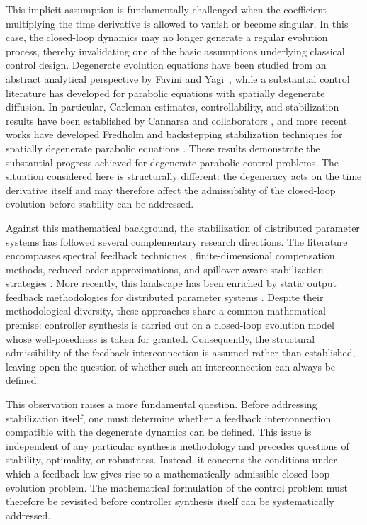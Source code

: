 \documentclass[pdflatex,sn-mathphys-num]{sn-jnl}
\theoremstyle{thmstyleone}%
\theoremstyle{thmstyletwo}%
\theoremstyle{thmstylethree}%
\begin{document}
This implicit assumption is fundamentally challenged when the coefficient multiplying the time derivative is allowed to vanish or become singular. In this case, the closed-loop dynamics may no longer generate a regular evolution process, thereby invalidating one of the basic assumptions underlying classical control design. Degenerate evolution equations have been studied from an abstract analytical perspective by Favini and Yagi~\cite{FaviniYagi1999Degenerate}, while a substantial control literature has developed for parabolic equations with spatially degenerate diffusion. In particular, Carleman estimates, controllability, and stabilization results have been established by Cannarsa and collaborators
\cite{CannarsaMartinezVancostenoble2008Carleman,
CannarsaMartinezVancostenoble2009Boundary}, and more recent works have developed Fredholm and backstepping stabilization techniques for spatially degenerate parabolic equations
\cite{GagnonLissyMarx2021Fredholm,
LissyMoreno2024Backstepping}.
These results demonstrate the substantial progress achieved for degenerate parabolic control problems. The situation considered here is structurally different: the degeneracy acts on the time derivative itself and may therefore affect the admissibility of the closed-loop evolution before stability can be addressed.


Against this mathematical background, the stabilization of distributed parameter systems has followed several complementary research directions. The literature encompasses spectral feedback techniques \cite{Triggiani1980Riccati,
BadraTakahashi2014Stabilization}, finite-dimensional compensation methods, reduced-order approximations, and spillover-aware stabilization strategies
\cite{Curtain1984FiniteDimensional,
CurtainSalamon1986Compensators,
CurtainGlover1986Robust,
Ito1990Galerkin,
GruneMeurer2022SmallGain,
TrelatWangXu2024POD}.
More recently, this landscape has been enriched by static output feedback methodologies for distributed parameter systems
\cite{GahlawatPeet2016SOF,
WuZhang2020StaticOutput,
LhachemiPrieur2025SOF}.
Despite their methodological diversity, these approaches share a common mathematical premise: controller synthesis is carried out on a closed-loop evolution model whose well-posedness is taken for granted. Consequently, the structural admissibility of the feedback interconnection is assumed rather than established, leaving open the question of whether such an interconnection can always be defined.

This observation raises a more fundamental question. Before addressing stabilization itself, one must determine whether a feedback interconnection compatible with the degenerate dynamics can be defined.
This issue is independent of any particular synthesis methodology and precedes questions of stability, optimality, or robustness. Instead, it concerns the conditions under which a feedback law gives rise to a mathematically admissible closed-loop evolution problem. The mathematical formulation of the control problem must therefore be revisited before controller synthesis itself can be systematically addressed.
\end{document}
